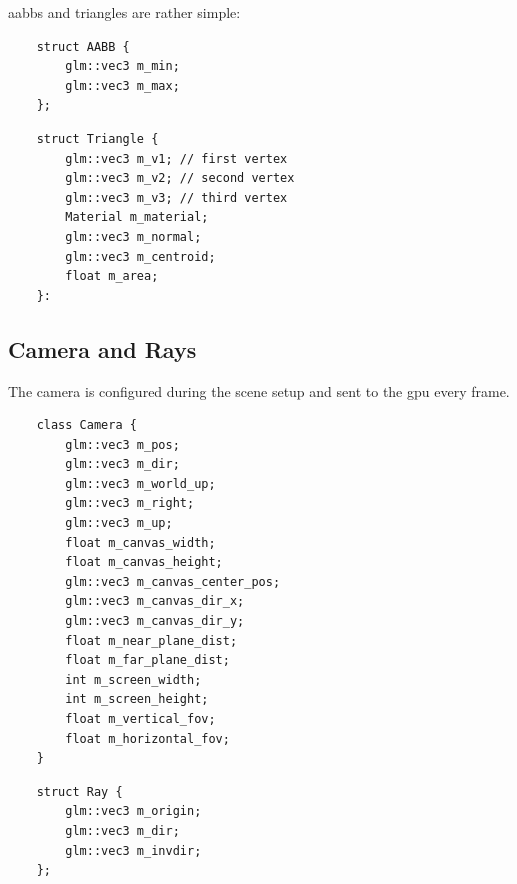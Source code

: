 \documentclass[
  twoside,
  11pt, a4paper,
  footinclude=true,
  headinclude=true,
  cleardoublepage=empty
]{scrreprt}
\begin{document}
\vspace{1cm}

\acp{aabb} and triangles are rather simple:

\begin{verbatim}
    struct AABB {
        glm::vec3 m_min;
        glm::vec3 m_max;
    };
\end{verbatim}

\begin{verbatim}
    struct Triangle {
        glm::vec3 m_v1; // first vertex
        glm::vec3 m_v2; // second vertex
        glm::vec3 m_v3; // third vertex
        Material m_material;
        glm::vec3 m_normal;
        glm::vec3 m_centroid;
        float m_area;
    }:
\end{verbatim}

\subsection{Camera and Rays}

The camera is configured during the scene setup and sent to the \ac{gpu} every frame.

\begin{verbatim}
    class Camera {
        glm::vec3 m_pos;
        glm::vec3 m_dir;
        glm::vec3 m_world_up;
        glm::vec3 m_right;
        glm::vec3 m_up;
        float m_canvas_width;
        float m_canvas_height;
        glm::vec3 m_canvas_center_pos;
        glm::vec3 m_canvas_dir_x;
        glm::vec3 m_canvas_dir_y;
        float m_near_plane_dist;
        float m_far_plane_dist;
        int m_screen_width;
        int m_screen_height;
        float m_vertical_fov;
        float m_horizontal_fov;
    }
\end{verbatim}

\begin{verbatim}
    struct Ray {
        glm::vec3 m_origin;
        glm::vec3 m_dir;
        glm::vec3 m_invdir;
    };
\end{verbatim}
\end{document}
